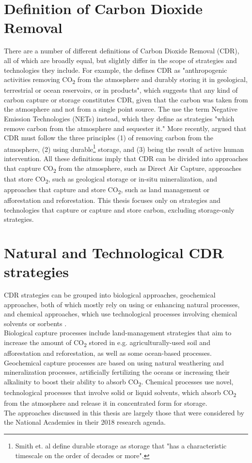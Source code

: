 \section{Definition of Carbon Dioxide Removal}
There are a number of different definitions of Carbon Dioxide Removal (CDR), all of which are broadly equal, but slightly differ in the scope of strategies and technologies they include. For example, the \textcite[544]{IPCC2018Global1.5C} defines CDR as "anthropogenic activities removing CO\textsubscript{2} from the atmosphere and durably storing it in geological, terrestrial or ocean reservoirs, or in products", which suggests that any kind of carbon capture or storage constitutes CDR, given that the carbon was taken from the atmosphere and not from a single point source. The \textcite[1]{NAS2018NegativeAgenda} use the term Negative Emission Technologies (NETs) instead, which they define as strategies "which remove carbon from the atmosphere and sequester it." More recently, \textcite{Smith2023TheEdition} argued that CDR must follow the three principles (1) of removing carbon from the atmosphere, (2) using durable\footnote{ Smith et. al define durable storage as storage that "has a characteristic timescale on the order of decades or more".} storage, and (3) being the result of active human intervention. All these definitions imply that CDR can be divided into approaches that capture CO\textsubscript{2} from the atmosphere, such as Direct Air Capture, approaches that store CO\textsubscript{2}, such as geological storage or in-situ mineralization, and approaches that capture and store CO\textsubscript{2}, such as land management or afforestation and reforestation. This thesis focuses only on strategies and technologies that capture or capture and store carbon, excluding storage-only strategies.
\section{Natural and Technological CDR strategies}
CDR strategies can be grouped into biological approaches, geochemical approaches, both of which mostly rely on using or enhancing natural processes, and chemical approaches, which use technological processes involving chemical solvents or sorbents \parencite{Smith2023TheEdition}.\\
Biological capture processes include land-management strategies that aim to increase the amount of CO\textsubscript{2} stored in e.g. agriculturally-used soil and afforestation and reforestation, as well as some ocean-based processes.
Geochemical capture processes are based on using natural weathering and mineralization processes, artificially fertilizing the oceans or increasing their alkalinity to boost their ability to absorb CO\textsubscript{2}.
Chemical processes use novel, technological processes that involve solid or liquid solvents, which absorb CO\textsubscript{2} from the atmosphere and release it in concentrated form for storage.\\
The approaches discussed in this thesis are largely those that were considered by the National Academies in their 2018 research agenda.
